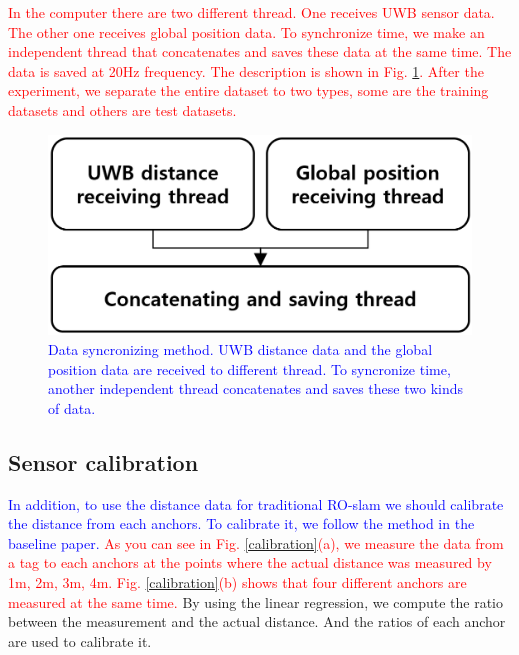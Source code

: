 \documentclass[letterpaper, 10 pt, conference]{ieeeconf}  %
\begin{document}
 \textcolor{red}{In the computer there are two different thread. One receives UWB sensor data. The other one receives global position data. To synchronize time, we make an independent thread that concatenates and saves these data at the same time. The data is saved at 20Hz frequency. The description is shown in Fig. \ref{fig:sync}. After the experiment, we separate the entire dataset to two types, some are the training datasets and others are test datasets.}

\begin{figure}[h]
	\centering
	\includegraphics[width=.9\linewidth]{figure2}
	\caption{\textcolor{blue}{Data syncronizing method. UWB distance data and the global position data are received to different thread. To syncronize time, another independent thread concatenates and saves these two kinds of data.}}
	\label{fig:sync}
\end{figure}

\subsection{Sensor calibration}
 \textcolor{blue}{In addition, to use the distance data for traditional RO-slam we should calibrate the distance from each anchors. To calibrate it, we follow the method in the baseline paper.} \textcolor{red}{As you can see in Fig. \ref{calibration}(a), we measure the data from a tag to each anchors at the points where the actual distance was measured by 1m, 2m, 3m, 4m. Fig. \ref{calibration}(b) shows that four different anchors are measured at the same time.} By using the linear regression, we compute the ratio between the measurement and the actual distance. And the ratios of each anchor are used to calibrate it.
\end{document}
